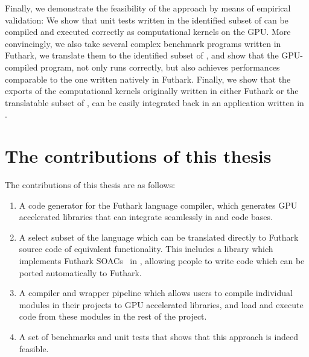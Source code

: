Finally, we demonstrate the feasibility of the approach by means of empirical validation:
We show that unit tests written in the identified subset of \fsharp{} can be compiled and 
executed correctly as computational kernels on the GPU. More convincingly, we also take 
several complex benchmark programs written in Futhark, we translate them to the identified
subset of \fsharp{}, and show that the GPU-compiled program, not only runs correctly,
but also achieves performances comparable to the one written natively in Futhark.
Finally, we show that the exports of the computational kernels originally written in 
either Futhark or the translatable subset of \fsharp{}, can be easily integrated back
in an application written in \csharp{}.

\clearpage

\section*{The contributions of this thesis}
The contributions of this thesis are as follows:
\begin{enumerate}
\item A \csharp{} code generator for the Futhark language compiler, which
  generates GPU accelerated libraries that can integrate seamlessly in 
  \csharp{} and \fsharp{} code bases.

\item A select subset of the \fsharp{} language which can be translated directly to
  Futhark source code of equivalent functionality. This includes a
  library which implements Futhark SOACs~\cite{pldi17} in \fsharp{}, allowing
  people to write \fsharp{} code which can be ported automatically to Futhark.

\item A compiler and wrapper pipeline which allows users to compile individual
  \fsharp{} modules in their projects to GPU accelerated libraries, and load and
  execute code from these modules in the rest of the \fsharp{} project.

\item A set of benchmarks and unit tests that shows that this approach is indeed feasible.
\end{enumerate}

\clearpage
